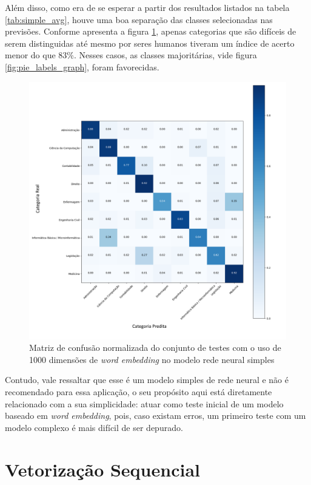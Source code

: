 Além disso, como era de se esperar a partir dos resultados listados na tabela \ref{tab:simple_avg}, houve uma boa separação das classes selecionadas nas previsões. Conforme apresenta a figura \ref{fig:confusion_matrix_1000_simpleAvg}, apenas categorias que são difíceis de serem distinguidas até mesmo por seres humanos tiveram um índice de acerto menor do que 83\%. Nesses casos, as classes majoritárias, vide figura \ref{fig:pie_labels_graph}, foram favorecidas.

\begin{figure}[!ht]
	\centering
	\includegraphics[width=1.1\textwidth]{figures/SimpleAvg_1000_Confusion_matrixnormalized.png}
	\caption{Matriz de confusão normalizada do conjunto de testes com o uso de 1000 dimensões de \textit{word embedding} no modelo rede neural simples}
	\label{fig:confusion_matrix_1000_simpleAvg}
\end{figure}

Contudo, vale ressaltar que esse é um modelo simples de rede neural e não é recomendado para essa aplicação, o seu propósito aqui está diretamente relacionado com a sua simplicidade: atuar como teste inicial de um modelo baseado em \textit{word embedding}, pois, caso existam erros, um primeiro teste com um modelo complexo é mais difícil de ser depurado. 

\section{Vetorização Sequencial}

